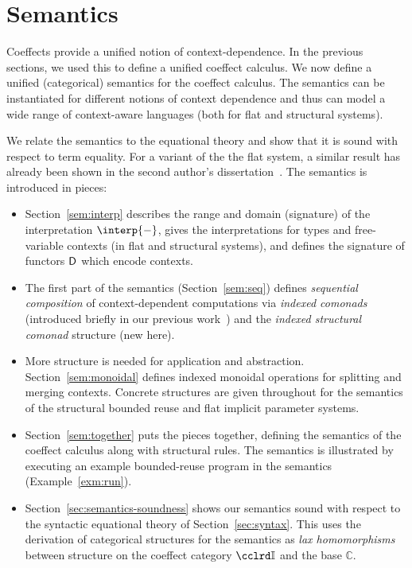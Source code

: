 
\section{Semantics}
\label{sec:semantics}

\newcommand{\Di}{\F}

Coeffects provide a unified notion of context-dependence. In the 
previous sections, we used this to define a unified coeffect calculus.
We now define a unified (categorical) semantics for the 
coeffect calculus. The semantics can be instantiated for different 
notions of context dependence and thus can model a wide range of
context-aware languages (both for flat and structural systems).

We relate the semantics to the equational theory and show that it is
sound with respect to term equality. For a variant
of the the flat system, a similar result has already been shown in the 
second author's dissertation~\cite{orchard2013thesis}.
The semantics is introduced in pieces: 

\begin{itemize}
\item
Section~\ref{sem:interp}
describes the range and domain (signature) of the interpretation $\interp{-}$, 
gives the interpretations for types and free-variable contexts (in
flat and structural systems), and defines the signature of
functors $\mathsf{D}$ which encode contexts. 


\item
The first part of the semantics (Section~\ref{sem:seq}) defines \emph{sequential
composition} of context-dependent computations via \emph{indexed
  comonads} (introduced briefly in our previous
work~\cite{petricek2013coeffects}) and the \emph{indexed structural
  comonad} structure (new here). 

\item
More structure is needed for application and abstraction. 
Section~\ref{sem:monoidal} defines
indexed monoidal operations for splitting and merging contexts.
Concrete structures are given throughout for the semantics of the
structural bounded reuse and flat implicit parameter systems.

\item
Section~\ref{sem:together} puts the pieces together, defining the
semantics of the coeffect calculus along with structural rules.  
The semantics is illustrated by executing an 
 example bounded-reuse program in 
the semantics (Example~\ref{exm:run}).%

\item
Section~\ref{sec:semantics-soundness} shows our
semantics sound with respect to the syntactic equational theory of
Section~\ref{sec:syntax}. This uses the derivation of 
categorical structures for the semantics as \emph{lax homomorphisms} between
structure on the coeffect category $\Icat$ and the base $\mathbb{C}$.  


\end{itemize}

